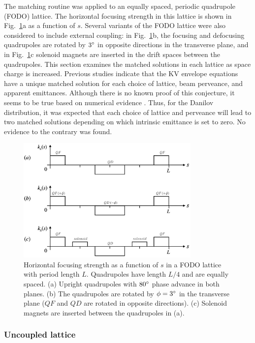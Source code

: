 The matching routine was applied to an equally spaced, periodic quadrupole (FODO) lattice. The horizontal focusing strength in this lattice is shown in Fig.~\ref{fig:fodo_lattices}a as a function of $s$. Several variants of the FODO lattice were also considered to include external coupling: in Fig.~\ref{fig:fodo_lattices}b, the focusing and defocusing quadrupoles are rotated by $3\degree$ in opposite directions in the transverse plane, and in Fig.~\ref{fig:fodo_lattices}c solenoid magnets are inserted in the drift spaces between the quadrupoles. This section examines the matched solutions in each lattice as space charge is increased. Previous studies indicate that the KV envelope equations have a unique matched solution for each choice of lattice, beam perveance, and apparent emittances. Although there is no known proof of this conjecture, it seems to be true based on numerical evidence \cite{Lund2006}. Thus, for the Danilov distribution, it was expected that each choice of lattice and perveance will lead to two matched solutions depending on which intrinsic emittance is set to zero. No evidence to the contrary was found.
%
\begin{figure}[!p]
    \centering
    \includegraphics[width=0.8\textwidth]{Images/chapter2/fodo_lattices.png}
    \caption{Horizontal focusing strength as a function of $s$ in a FODO lattice with period length $L$. Quadrupoles have length $L/4$ and are equally spaced. (a) Upright quadrupoles with $80\degree$ phase advance in both planes. (b) The quadrupoles are rotated by $\phi = 3\degree$ in the transverse plane ($QF$ and $QD$ are rotated in opposite directions). (c) Solenoid magnets are inserted between the quadrupoles in (a).}
    \label{fig:fodo_lattices}
\end{figure}


\subsubsection{Uncoupled lattice}

